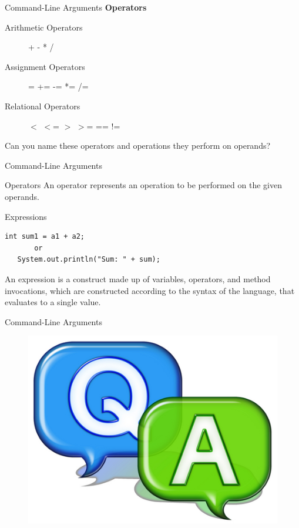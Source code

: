 \documentclass[12pt]{beamer}
\begin{document}
\begin{frame}{Command-Line Arguments}
 \textbf{Operators}
 
 \begin{description}
  \item [Arithmetic Operators] + \hspace{.4pc}- \hspace{.4pc}* \hspace{.4pc}/
  \item [Assignment Operators] = \hspace{.4pc}+= \hspace{.4pc}-= \hspace{.4pc}*= \hspace{.4pc}/=
  \item [Relational Operators] $<$ \hspace{.4pc}$<$= \hspace{.4pc}$>$ \hspace{.4pc}$>$= \hspace{.4pc}== \hspace{.4pc}!=
  \end{description}
  Can you name these operators and operations they perform on operands?
\end{frame}

\begin{frame}[fragile]{Command-Line Arguments}
 \begin{block}{Operators} 
 An operator represents an operation to be performed on the given operands.
 \end{block}
 \begin{block}{Expressions}
  \begin{lstlisting}[numbers=none]
   int sum1 = a1 + a2;
       or
   System.out.println("Sum: " + sum);
  \end{lstlisting}
 \end{block}
An expression is a construct made up of variables, operators, and method invocations, which are constructed according to the syntax of the language, that evaluates to a single value.
 
\end{frame}


\begin{frame}{Command-Line Arguments}
 \begin{figure}[H]
 \begin{center}
   \includegraphics[scale=.3]{qa.png}   
 \end{center}
  \end{figure}
\end{frame}
\end{document}
